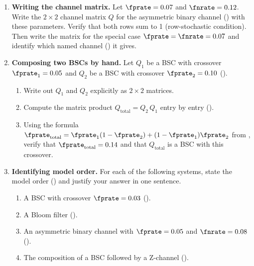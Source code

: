 \begin{enumerate}


\item \exstar
\textbf{Writing the channel matrix.}
Let $\fprate = 0.07$ and $\fnrate = 0.12$.
Write the $2 \times 2$ channel matrix $Q$ for the asymmetric binary
channel () with these parameters.
Verify that both rows sum to 1 (row-stochastic condition).
Then write the matrix for the special case $\fprate = \fnrate = 0.07$
and identify which named channel () it gives.

\item \exstar
\textbf{Composing two BSCs by hand.}
Let $Q_1$ be a BSC with crossover $\fprate_1 = 0.05$ and $Q_2$ be a
BSC with crossover $\fprate_2 = 0.10$ ().
\begin{enumerate}
  \item[(a)] Write out $Q_1$ and $Q_2$ explicitly as $2 \times 2$ matrices.
  \item[(b)] Compute the matrix product $Q_{\mathrm{total}} = Q_2\, Q_1$
    entry by entry ().
  \item[(c)] Using the formula $\fprate_{\mathrm{total}} = \fprate_1(1-\fprate_2) +
    (1-\fprate_1)\fprate_2$ from , verify that
    $\fprate_{\mathrm{total}} = 0.14$ and that $Q_{\mathrm{total}}$ is a
    BSC with this crossover.
\end{enumerate}

\item \exstar
\textbf{Identifying model order.}
For each of the following systems, state the model order
() and justify your answer in one sentence.
\begin{enumerate}
  \item[(a)] A BSC with crossover $\fprate = 0.03$ ().
  \item[(b)] A Bloom filter ().
  \item[(c)] An asymmetric binary channel with $\fprate = 0.05$ and
    $\fnrate = 0.08$ ().
  \item[(d)] The composition of a BSC followed by a Z-channel
    ().
\end{enumerate}


\end{enumerate}
